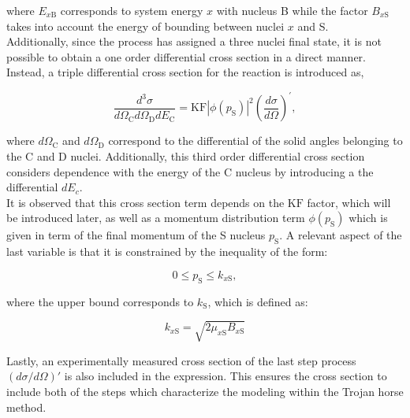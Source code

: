 \documentclass[openany]{book}
\begin{document}
where $E_{x\mathrm{B}}$ corresponds to system energy $x$ with nucleus B while the factor $B_{x\mathrm{S}}$ takes into account the energy of bounding between nuclei $x$ and S.  \\

Additionally, since the process has assigned a three nuclei final state, it is not possible to obtain a one order differential cross section in a direct manner. Instead, a triple differential cross section for the reaction is introduced as, 

\begin{equation}\label{eq:special_THM_triple differential}
	\frac{d^3\sigma }{d\Omega_{\mathrm{C}} d\Omega_{\mathrm{D}} dE_\mathrm{C}} = \mathrm{KF} |\phi(p_\mathrm{S})|^2 \left(  \frac{d\sigma}{d\Omega}\right)^{'},
\end{equation}

where $d\Omega_\mathrm{C}$ and $d\Omega_\mathrm{D}$ correspond to the differential of the solid angles belonging to the C and D nuclei. Additionally, this third order differential cross section considers dependence with the energy of the C nucleus by introducing a the differential $dE_c$. \\ 

It is observed that this cross section term depends on the $\mathrm{KF}$ factor, which will be introduced later, as well as a momentum distribution term $\phi(p_\mathrm{S})$ which is given in term of the final momentum of the S nucleus $p_\mathrm{S}$. A relevant aspect of the last variable is that it is constrained by the inequality of the form:

\begin{equation}\label{eq:special_THM_momentum_inequality}
	0 \le p_\mathrm{S} \le k_{x\mathrm{S}},
\end{equation}

where the upper bound corresponds to $k_{\mathrm{S}}$, which is defined as: 

\begin{equation}\label{eq:special_THM_momentum_max}
	k_{x\mathrm{S}} = \sqrt{2 \mu_{x\mathrm{S}}  B_{x\mathrm{S}}}
\end{equation}

Lastly, an experimentally measured cross section of the last step process $(d\sigma/d\Omega)'$ is also included in the expression. This ensures the cross section to include both of the steps which characterize the modeling within the Trojan horse method.  \\
\end{document}
